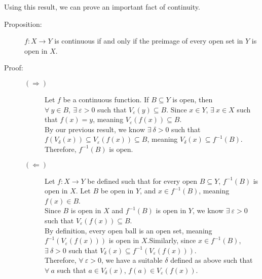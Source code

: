 \documentclass[12pt]{extarticle}
\begin{document}
  Using this result, we can prove an important fact of continuity.
  \begin{description}
    \item[Proposition:] $f: X\rightarrow Y$ is continuous if and only if the preimage of every open set in $Y$ is open in $X$.
    \item[Proof:]
      \begin{description}
        \item[$(\Rightarrow)$] Let $f$ be a continuous function. If $B\subseteq Y$ is open, then $\forall~y\in B,~\exists~\varepsilon > 0$ such that $V_{\varepsilon}(y) \subseteq B$. Since $x\in Y$, $\exists~x\in X$ such that $f(x) = y$, meaning $V_{\varepsilon}(f(x)) \subseteq B$.\\

          By our previous result, we know $\exists~\delta > 0$ such that $f(V_{\delta}(x))\subseteq V_{\varepsilon}(f(x))\subseteq B$, meaning $V_{\delta}(x) \subseteq f^{-1}(B)$. Therefore, $f^{-1}(B)$ is open.
        \item[$(\Leftarrow)$] Let $f: X \rightarrow Y$ be defined such that for every open $B\subseteq Y$, $f^{-1}(B)$ is open in $X$. Let $B$ be open in $Y$, and $x\in f^{-1}(B)$, meaning $f(x)\in B$.\\

          Since $B$ is open in $X$ and $f^{-1}(B)$ is open in $Y$, we know $\exists~\varepsilon > 0$ such that $V_{\varepsilon}(f(x))\subseteq B$.\\

          By definition, every open ball is an open set, meaning $f^{-1}(V_{\varepsilon}(f(x)))$ is open in $X$.Similarly, since $x\in f^{-1}(B)$, $\exists~\delta > 0$ such that $V_{\delta}(x)\subseteq f^{-1}(V_{\varepsilon}(f(x)))$.\\

          Therefore, $\forall~\varepsilon > 0$, we have a suitable $\delta$ defined as above such that $\forall~a$ such that $a\in V_{\delta}(x)$, $f(a)\in V_{\varepsilon}(f(x))$.
      \end{description}
  \end{description}
\end{document}
